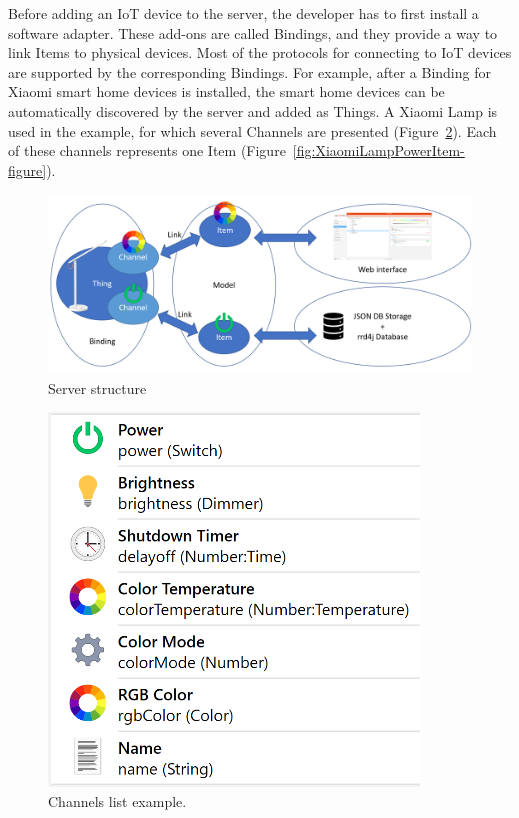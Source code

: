 Before adding an IoT device to the server, the developer has to first install a software adapter. These add-ons are called Bindings, and they provide a way to link Items to physical devices. Most of the protocols for connecting to IoT devices are supported by the corresponding Bindings. For example, after a Binding for Xiaomi smart home devices is installed, the smart home devices can be automatically discovered by the server and added as Things. A Xiaomi Lamp is used in the example, for which several Channels are presented (Figure~\ref{fig:XiaomiLampChannels-figure}). Each of these channels represents one Item (Figure~\ref{fig:XiaomiLampPowerItem-figure}).

\begin{figure}
  \centering
  \includegraphics[width=0.9\linewidth]{figures/openHABServerStructure.png}
  \caption{Server structure}
  \label{fig:openHABServerStructure-figure}
\end{figure}

\begin{figure}
  \centering
  \includegraphics[width=0.6\linewidth]{figures/XiaomiLampChannels.png}
  \caption{Channels list example.}
  \label{fig:XiaomiLampChannels-figure}
\end{figure}

